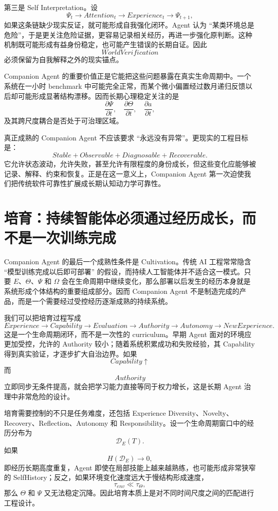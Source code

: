 第三是 Self Interpretation。设
\[
\Psi_t
\rightarrow
Attention_t
\rightarrow
Experience_t
\rightarrow
\Psi_{t+1},
\]
如果这条链缺少现实反证，就可能形成自我强化闭环。Agent 认为 ``某类环境总是危险''，于是更关注危险证据，更容易记录相关经历，再进一步强化原判断。这种机制既可能形成有益身份稳定，也可能产生错误的长期自证。因此
\[
WorldVerification
\]
必须保留为自我解释之外的现实锚点。

Companion Agent 的重要价值正是它能把这些问题暴露在真实生命周期中。一个系统在一小时 benchmark 中可能完全正常，而某个微小偏置经过数月递归反馈以后却可能形成显著结构漂移。因而长期心理稳定关注的是
\[
\frac{\partial \Psi}{\partial t},
\quad
\frac{\partial \Theta}{\partial t},
\quad
\frac{\partial a}{\partial t},
\]
及其跨尺度耦合是否处于可治理区域。

真正成熟的 Companion Agent 不应该要求 ``永远没有异常''。更现实的工程目标是：
\[
\boxed{
Stable
+
Observable
+
Diagnosable
+
Recoverable .
}
\]
它允许状态波动，允许失败，甚至允许有限程度的身份成长，但这些变化应能够被记录、解释、约束和恢复。正是在这一意义上，Companion Agent 第一次迫使我们把传统软件可靠性扩展成长期认知动力学可靠性。

\section{培育：持续智能体必须通过经历成长，而不是一次训练完成}

Companion Agent 的最后一个成熟性条件是 Cultivation。传统 AI 工程常常隐含 ``模型训练完成以后即可部署'' 的假设，而持续人工智能体并不适合这一模式。只要 $E$、$\Theta$、$\Psi$ 和 $\Omega$ 会在生命周期中继续变化，那么部署以后发生的经历本身就是系统形成个体结构的重要组成部分。因而 Companion Agent 不是制造完成的产品，而是一个需要经过受控经历逐渐成熟的持续系统。

我们可以把培育过程写成
\[
Experience
\rightarrow
Capability
\rightarrow
Evaluation
\rightarrow
Authority
\rightarrow
Autonomy
\rightarrow
NewExperience .
\]
这是一个生命周期闭环，而不是一次性的 curriculum。早期 Agent 面对的环境应更加受控，允许的 Authority 较小；随着系统积累成功和失败经验，其 Capability 得到真实验证，才逐步扩大自治边界。如果
\[
Capability\uparrow
\]
而
\[
Authority
\]
立即同步无条件提高，就会把学习能力直接等同于权力增长，这是长期 Agent 治理中非常危险的设计。

培育需要控制的不只是任务难度，还包括 Experience Diversity、Novelty、Recovery、Reflection、Autonomy 和 Responsibility。设一个生命周期窗口中的经历分布为
\[
\mathcal D_E(T).
\]
如果
\[
H(\mathcal D_E)\rightarrow 0,
\]
即经历长期高度重复，Agent 即使在局部技能上越来越熟练，也可能形成非常狭窄的 SelfHistory；反之，如果环境变化速度远大于慢结构形成速度，
\[
\tau_{env}
\ll
\tau_{\Theta},
\]
那么 $\Theta$ 和 $\Psi$ 又无法稳定沉降。因此培育本质上是对不同时间尺度之间的匹配进行工程设计。

